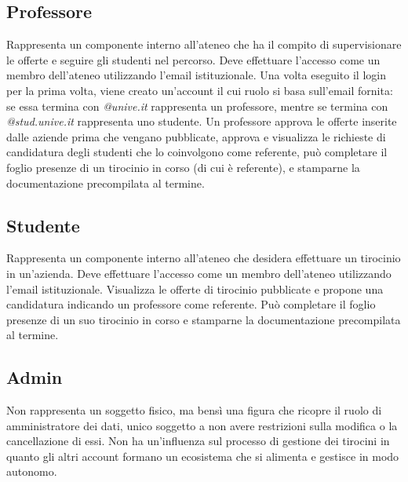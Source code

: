 \subsection{Professore}
Rappresenta un componente interno all'ateneo che ha il compito di supervisionare le offerte e seguire gli studenti nel percorso.
Deve effettuare l'accesso come un membro dell'ateneo utilizzando l'email istituzionale. Una volta eseguito il login per la prima volta, viene creato un'account il cui ruolo si basa sull'email fornita: se essa termina con \textit{@unive.it} rappresenta un professore, mentre se termina con \textit{@stud.unive.it} rappresenta uno studente. 
Un professore approva le offerte inserite dalle aziende prima che vengano pubblicate, approva e visualizza le richieste di candidatura degli studenti che lo coinvolgono come referente, può completare il foglio presenze di un tirocinio in corso (di cui è referente), e stamparne la documentazione precompilata al termine.

\subsection{Studente}
Rappresenta un componente interno all'ateneo che desidera effettuare un tirocinio in un'azienda.
Deve effettuare l'accesso come un membro dell'ateneo utilizzando l'email istituzionale. Visualizza le offerte di tirocinio pubblicate e propone una candidatura indicando un professore come referente. Può completare il foglio presenze di un suo tirocinio in corso e stamparne la documentazione precompilata al termine.

\subsection{Admin}
Non rappresenta un soggetto fisico, ma bensì una figura che ricopre il ruolo di amministratore dei dati, unico soggetto a non avere restrizioni sulla modifica o la cancellazione di essi. Non ha un'influenza sul processo di gestione dei tirocini in quanto gli altri account formano un ecosistema che si alimenta e gestisce in modo autonomo.